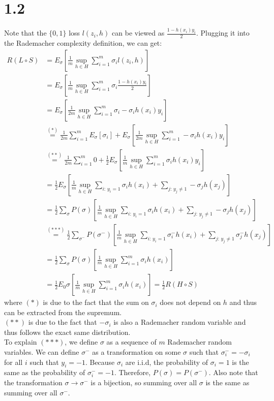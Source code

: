 \documentclass{article}
\begin{document}
\section*{1.2}
Note that the $\{0,1\}$ loss $l(z_i, h)$ can be viewed as $\frac{1-h(x_i)y_i}{2}$. Plugging it into the Rademacher complexity definition, we can get:
\begin{align*}
    R(L\circ S) &= E_\sigma \left[ \frac{1}{m}\sup_{h \in H}\sum_{i=1}^m \sigma_i l(z_i, h) \right] \\ &= E_\sigma \left[ \frac{1}{m}\sup_{h \in H}\sum_{i=1}^m \sigma_i \frac{1-h(x_i)y_i}{2} \right] \\ &= E_\sigma \left[ \frac{1}{2m}\sup_{h \in H}\sum_{i=1}^m \sigma_i - \sigma_i h(x_i)y_i \right] \\ 
    &\stackrel{(*)}{=} \frac{1}{2m}\sum_{i=1}^mE_\sigma\left[\sigma_i\right] + E_\sigma\left[\frac{1}{2m}\sup_{h\in H}\sum_{i=1}^m -\sigma_i h(x_i)y_i\right] \\
    &\stackrel{(**)}{=} \frac{1}{2m}\sum_{i=1}^m 0 + \frac{1}{2}E_\sigma\left[\frac{1}{m}\sup_{h\in H}\sum_{i=1}^m \sigma_i h(x_i)y_i\right] \\
    &= \frac{1}{2}E_\sigma\left[\frac{1}{m}\sup_{h\in H}\sum_{i: \, y_i=1} \sigma_i h(x_i) + \sum_{j: \, y_j\neq1} -\sigma_j h(x_j)\right] \\ 
    &= \frac{1}{2}\sum_{\sigma} P(\sigma)\left[ \frac{1}{m}\sup_{h\in H}\sum_{i: \, y_i=1} \sigma_i h(x_i) + \sum_{j: \, y_j\neq1} -\sigma_j h(x_j) \right] \\
    &\stackrel{(***)}{=} \frac{1}{2}\sum_{\sigma^-} P(\sigma^-)\left[ \frac{1}{m}\sup_{h\in H}\sum_{i: \, y_i=1} \sigma^-_i h(x_i) + \sum_{j: \, y_j\neq1} \sigma^-_j h(x_j) \right] \\
    &= \frac{1}{2}\sum_{\sigma} P(\sigma)\left[\frac{1}{m}\sup_{h\in H}\sum_{i=1}^m \sigma_i h(x_i)\right] \\
    &= \frac{1}{2}E_0\sigma\left[\frac{1}{m}\sup_{h\in H}\sum_{i=1}^m \sigma_i h(x_i)\right] = \frac{1}{2}R(H \circ S)
\end{align*}
where $(*)$ is due to the fact that the sum on $\sigma_i$ does not depend on $h$ and thus can be extracted from the supremum.\\
$(**)$ is due to the fact that $-\sigma_i$ is also a Rademacher random variable and thus follows the exact same distribution.\\
To explain $(***)$, we define $\sigma$ as a sequence of $m$ Rademacher random variables. We can define $\sigma^-$ as
a transformation on some $\sigma$ such that $\sigma^-_i = -\sigma_i$ for all $i$ such that $y_i = -1$. Because $\sigma_i$
are i.i.d, the probability of $\sigma_i = 1$ is the same as the probability of $\sigma^-_i = -1$. Therefore, $P(\sigma) = P(\sigma^-)$.
Also note that the transformation $\sigma \rightarrow \sigma^-$ is a bijection, so summing over all $\sigma$ is the same as summing over all $\sigma^-$.\\
\end{document}

